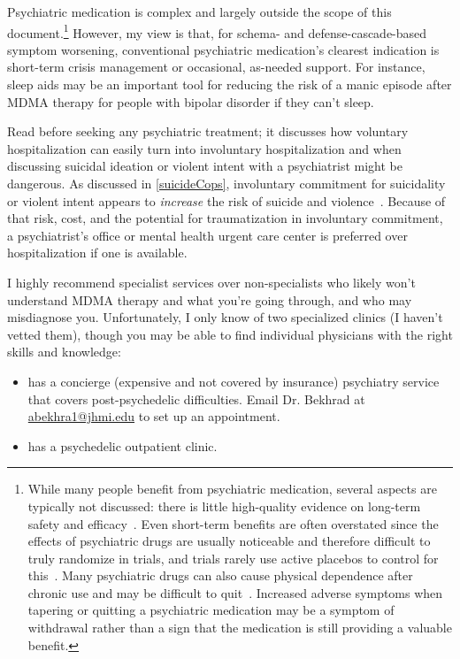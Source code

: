 \documentclass[11pt,oneside]{book}
\let\cite\parencite
\begin{document}
Psychiatric medication is complex and largely outside the scope of this document.\footnote{While many people benefit from psychiatric medication, several aspects are typically not discussed: there is little high-quality evidence on long-term safety and efficacy~\cite{leuchtDecline}. Even short-term benefits are often overstated since the effects of psychiatric drugs are usually noticeable and therefore difficult to truly randomize in trials, and trials rarely use active placebos to control for this~\cite{hunekeExpectancy}. Many psychiatric drugs can also cause physical dependence after chronic use and may be difficult to quit~\cite{crossingZero}. Increased adverse symptoms when tapering or quitting a psychiatric medication may be a symptom of withdrawal rather than a sign that the medication is still providing a valuable benefit.} However, my view is that, for schema- and defense-cascade-based symptom worsening, conventional psychiatric medication's clearest indication is short-term crisis management or occasional, as-needed support. For instance, sleep aids may be an important tool for reducing the risk of a manic episode after MDMA therapy for people with bipolar disorder if they can't sleep.

Read \textcite{alexanderInpatient} before seeking any psychiatric treatment; it discusses how voluntary hospitalization can easily turn into involuntary hospitalization and when discussing suicidal ideation or violent intent with a psychiatrist might be dangerous. As discussed in \cref{suicideCops}, involuntary commitment for suicidality or violent intent appears to \textit{increase} the risk of suicide and violence~\cite{emanuelHospitalization}. Because of that risk, cost, and the potential for traumatization in involuntary commitment, a psychiatrist's office or mental health urgent care center is preferred over hospitalization if one is available.

I highly recommend specialist services over non-specialists who likely won't understand MDMA therapy and what you're going through, and who may misdiagnose you. Unfortunately, I only know of two specialized clinics (I haven't vetted them), though you may be able to find individual physicians with the right skills and knowledge:
\begin{itemize}
	\item \textcite{hopkinsPersonalized} has a concierge (expensive and not covered by insurance) psychiatry service that covers post-psychedelic difficulties. Email Dr. Bekhrad at \href{mailto:abekhra1@jhmi.edu}{abekhra1@jhmi.edu} to set up an appointment.
	\item \textcite{alexianerClinic} has a psychedelic outpatient clinic.
\end{itemize}
\end{document}
